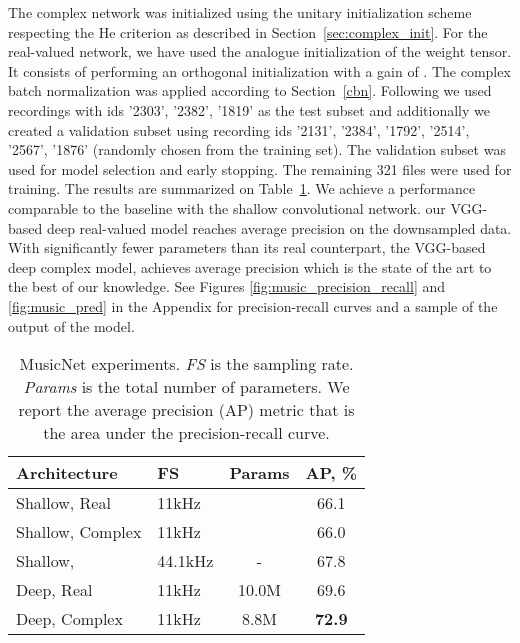 \documentclass{article}
\begin{document}
The complex network was initialized using the unitary initialization scheme respecting the He criterion as described in Section~\ref{sec:complex_init}. For the real-valued network, we have used the analogue initialization of the weight tensor. It consists of performing an orthogonal initialization with a gain of . The complex batch normalization was applied according to Section~\ref{cbn}.
Following \citet{thickstun2016learning} we used recordings with ids '2303', '2382', '1819' as the test subset and additionally we 
created a validation subset using recording ids '2131', '2384', '1792', '2514', '2567', '1876' (randomly chosen from the training set).
The validation subset was used for model selection and early stopping. The remaining 321 files were used for training.
The results are summarized on Table~\ref{tab:musicnet}. We achieve a performance comparable to the baseline with the shallow convolutional network. our VGG-based deep real-valued model reaches  average precision on the downsampled data. With significantly fewer parameters than its real counterpart, the VGG-based deep complex model, achieves  average precision which is the state of the art to the best of our knowledge. See Figures \ref{fig:music_precision_recall} and \ref{fig:music_pred} in the Appendix for precision-recall curves and a sample of the output of the model.

\begin{table}[t]
\vskip 0.15in
\begin{center}
\caption{MusicNet experiments. \emph{FS} is the sampling rate. \emph{Params} is the total number of parameters. We report the average precision (AP) metric that is the area under the precision-recall curve.}
\label{tab:musicnet}
\begin{small}
\begin{sc}
\begin{tabular}{llc|c}
\toprule
Architecture & FS & Params & AP, \% \\
\midrule
Shallow, Real & 11kHz &  & 66.1 \\
Shallow, Complex & 11kHz & & 66.0 \\
Shallow, \citet{thickstun2016learning} & 44.1kHz & - & 67.8 \\
\midrule
Deep, Real & 11kHz & 10.0M &  69.6 \\
Deep, Complex & 11kHz & 8.8M & \textbf{72.9} \\
\bottomrule
\end{tabular}
\end{sc}
\end{small}
\end{center}
\vskip -0.1in
\end{table}
\end{document}

